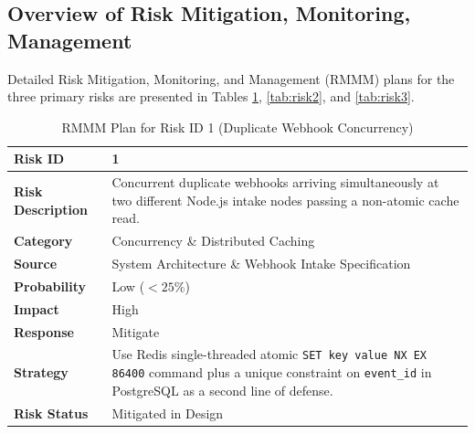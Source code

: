 \documentclass[oneside,a4paper,12pt]{report}
\begin{document}
\subsection{Overview of Risk Mitigation, Monitoring, Management}
Detailed Risk Mitigation, Monitoring, and Management (RMMM) plans for the three primary risks are presented in Tables \ref{tab:risk1}, \ref{tab:risk2}, and \ref{tab:risk3}.

\begin{table}[!htbp]
\begin{center}
\renewcommand{\arraystretch}{1.3}
\begin{tabularx}{\textwidth}{|l|X|}
\hline
\textbf{Risk ID} & 1 \\ \hline
\textbf{Risk Description} & Concurrent duplicate webhooks arriving simultaneously at two different Node.js intake nodes passing a non-atomic cache read. \\ \hline
\textbf{Category} & Concurrency \& Distributed Caching \\ \hline
\textbf{Source} & System Architecture \& Webhook Intake Specification \\ \hline
\textbf{Probability} & Low ($<25\%$) \\ \hline
\textbf{Impact} & High \\ \hline
\textbf{Response} & Mitigate \\ \hline
\textbf{Strategy} & Use Redis single-threaded atomic \texttt{SET key value NX EX 86400} command plus a unique constraint on \texttt{event\_id} in PostgreSQL as a second line of defense. \\ \hline
\textbf{Risk Status} & Mitigated in Design \\ \hline
\end{tabularx}
\end{center}
\caption{RMMM Plan for Risk ID 1 (Duplicate Webhook Concurrency)}
\label{tab:risk1}
\end{table}
\end{document}
